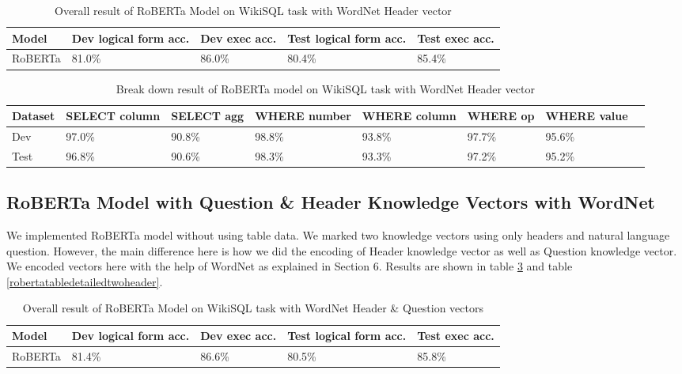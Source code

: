 \documentclass[12pt]{article}
\begin{document}
 \begin{table}
\centering
 \begin{tabular}{| m{2cm} | m{2cm}| m{2cm} |m{2cm}| m{2cm} |} 
 \hline
Model & Dev logical form acc. & Dev exec acc. & Test logical form acc. & Test exec acc. \\ 
 \hline\hline
  RoBERTa & 81.0\% & 86.0\% & 80.4\% & 85.4\% \\ 
 \hline
\end{tabular}
\caption{Overall result of RoBERTa Model on WikiSQL task with WordNet Header vector}
\label{robertatableoneheader}
\end{table}


\begin{table}
\centering
 \begin{tabular}{| m{2cm} | m{2cm}| m{2cm} |m{2cm}| m{2cm} |m{2cm} | m{2cm} |m{2cm} |} 
 \hline
  Dataset & SELECT column & SELECT agg & WHERE number & WHERE column & WHERE op & WHERE value\\ 
 \hline\hline
  Dev & 97.0\% & 90.8\% & 98.8\% & 93.8\% & 97.7\% &  95.6\% \\ 
\hline
 Test & 96.8\% & 90.6\% & 98.3\% & 93.3\% & 97.2\% &  95.2\% \\ 
 \hline

\end{tabular}
\caption{Break down result of RoBERTa model on WikiSQL task with WordNet Header vector}
\label{robertatabledetailedoneheader}
\end{table}


\subsection{RoBERTa Model with Question \& Header Knowledge Vectors with WordNet}

We implemented RoBERTa model without using table data. We marked two knowledge vectors using only headers and natural language question. However, the main difference here is how we did the  encoding of Header knowledge vector as well as Question knowledge vector. We encoded vectors here with the help of WordNet as explained in Section 6. Results are shown in table \ref{robertatabletwoheader} and table \ref{robertatabledetailedtwoheader}.

 \begin{table}
\centering
 \begin{tabular}{| m{2cm} | m{2cm}| m{2cm} |m{2cm}| m{2cm} |} 
 \hline
Model & Dev logical form acc. & Dev exec acc. & Test logical form acc. & Test exec acc. \\ 
 \hline\hline
  RoBERTa & 81.4\% & 86.6\% & 80.5\% & 85.8\% \\ 
 \hline
\end{tabular}
\caption{Overall result of RoBERTa Model on WikiSQL task with WordNet Header \& Question vectors}
\label{robertatabletwoheader}
\end{table}
\end{document}
